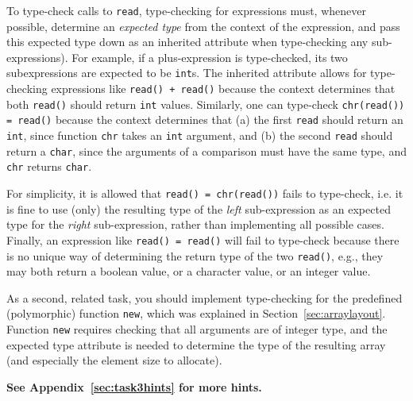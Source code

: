 \documentclass[12pt,a4paper]{article}
\begin{document}
{To type-check calls to \texttt{read}, type-checking for expressions must,
whenever possible, determine an \emph{expected type} from the context of the
expression, and pass this expected type down as an inherited attribute when
type-checking any sub-expressions).
%
For example, if a plus-expression is type-checked, its two %
subexpressions are expected to be \texttt{int}s. The inherited attribute
allows for type-checking expressions like \texttt{read() + read()}
because the context determines that both \texttt{read()} should return
\texttt{int} values.
%
Similarly, one can type-check \texttt{chr(read()) = read()}
because the context determines that
(a) the first \texttt{read} should return an \texttt{int},
            since function \texttt{chr} takes an \texttt{int} argument,
and (b) the second \texttt{read} should return a \texttt{char}, since 
            the arguments of a 
            comparison must have the same type, and \texttt{chr}
            returns \texttt{char}.


For simplicity, it is allowed that \texttt{read() = chr(read())}
fails to type-check, i.e. it is fine to use (only) the resulting type
of the \emph{left} sub-expression as an expected type for the \emph{right} sub-expression,
rather than implementing all possible cases.
Finally, an expression like \texttt{read() = read()}
will fail to type-check because there is no unique way of determining
the return type of the two \texttt{read()}, e.g., they may both return
a boolean value, or a character value, or an integer value.

As a second, related task, you should implement type-checking for the
predefined (polymorphic) function \texttt{new},
which was explained in Section~\ref{sec:arraylayout}.
%
Function \texttt{new} requires checking that all arguments are of
integer type, and the expected type attribute is needed to determine
the type of the resulting array (and especially the element size to allocate).

{\bf See Appendix~\ref{sec:task3hints} for more hints.}

}
\end{document}

